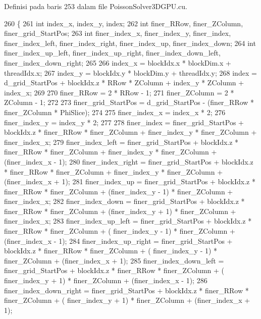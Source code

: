 Definisi pada baris 253 dalam file Poisson\+Solver3\+D\+G\+P\+U.\+cu.


\begin{DoxyCode}
260 \{
261     \textcolor{keywordtype}{int} index\_x, index\_y, index;
262     \textcolor{keywordtype}{int} finer\_RRow, finer\_ZColumn, finer\_grid\_StartPos;
263     \textcolor{keywordtype}{int} finer\_index\_x, finer\_index\_y, finer\_index, finer\_index\_left, finer\_index\_right, finer\_index\_up, 
      finer\_index\_down;
264     \textcolor{keywordtype}{int} finer\_index\_up\_left, finer\_index\_up\_right, finer\_index\_down\_left, finer\_index\_down\_right;
265     
266     index\_x = blockIdx.x * blockDim.x + threadIdx.x;
267     index\_y = blockIdx.y * blockDim.y + threadIdx.y;
268     index   = d\_grid\_StartPos + blockIdx.z * RRow * ZColumn + index\_y * ZColumn + index\_x;
269 
270     finer\_RRow = 2 * RRow - 1;
271     finer\_ZColumn = 2 * ZColumn - 1;
272 
273     finer\_grid\_StartPos = d\_grid\_StartPos - (finer\_RRow * finer\_ZColumn * PhiSlice);
274 
275     finer\_index\_x = index\_x * 2;
276     finer\_index\_y = index\_y * 2;
277 
278     finer\_index         = finer\_grid\_StartPos + blockIdx.z * finer\_RRow * finer\_ZColumn + finer\_index\_y * 
      finer\_ZColumn + finer\_index\_x;
279     finer\_index\_left    = finer\_grid\_StartPos + blockIdx.z * finer\_RRow * finer\_ZColumn + finer\_index\_y * 
      finer\_ZColumn + (finer\_index\_x - 1);
280     finer\_index\_right   = finer\_grid\_StartPos + blockIdx.z * finer\_RRow * finer\_ZColumn + finer\_index\_y * 
      finer\_ZColumn + (finer\_index\_x + 1);
281     finer\_index\_up      = finer\_grid\_StartPos + blockIdx.z * finer\_RRow * finer\_ZColumn + (finer\_index\_y - 
      1) * finer\_ZColumn + finer\_index\_x;
282     finer\_index\_down    = finer\_grid\_StartPos + blockIdx.z * finer\_RRow * finer\_ZColumn + (finer\_index\_y + 
      1) * finer\_ZColumn + finer\_index\_x;
283     finer\_index\_up\_left     = finer\_grid\_StartPos + blockIdx.z * finer\_RRow * finer\_ZColumn + (
      finer\_index\_y - 1) * finer\_ZColumn + (finer\_index\_x - 1);
284     finer\_index\_up\_right    = finer\_grid\_StartPos + blockIdx.z * finer\_RRow * finer\_ZColumn + (
      finer\_index\_y - 1) * finer\_ZColumn + (finer\_index\_x + 1);
285     finer\_index\_down\_left   = finer\_grid\_StartPos + blockIdx.z * finer\_RRow * finer\_ZColumn + (
      finer\_index\_y + 1) * finer\_ZColumn + (finer\_index\_x - 1);
286     finer\_index\_down\_right  = finer\_grid\_StartPos + blockIdx.z * finer\_RRow * finer\_ZColumn + (
      finer\_index\_y + 1) * finer\_ZColumn + (finer\_index\_x + 1);

\end{DoxyCode}
